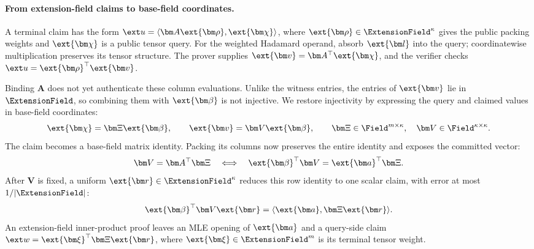 \paragraph{From extension-field claims to base-field coordinates.}
A terminal claim has the form
\(\ext u=\langle\bm A\ext{\bm\rho},\ext{\bm\chi}\rangle\),
where \(\ext{\bm\rho}\in\ExtensionField^\kappa\) gives the public
packing weights and \(\ext{\bm\chi}\) is a public tensor query.
For the weighted Hadamard operand, absorb \(\ext{\bm l}\) into the query;
coordinatewise multiplication preserves its tensor structure.
The prover supplies \(\ext{\bm v}=\bm A^\top\ext{\bm\chi}\), and
the verifier checks \(\ext u=\ext{\bm\rho}^{\top}\ext{\bm v}\).

Binding \(\bm A\) does not yet authenticate these column evaluations.
Unlike the witness entries, the entries of \(\ext{\bm v}\) lie in
\(\ExtensionField\), so combining them with \(\ext{\bm\beta}\) is not
injective. We restore injectivity by expressing the query and claimed
values in base-field coordinates:
\[
    \ext{\bm\chi}=\bm\Xi\ext{\bm\beta},
    \qquad
    \ext{\bm v}=\bm V\ext{\bm\beta},
    \qquad
    \bm\Xi\in\Field^{m\times\kappa},
    \quad \bm V\in\Field^{\kappa\times\kappa}.
\]
The claim becomes a base-field matrix identity. Packing its columns
now preserves the entire identity and exposes the committed vector:
\begin{equation*}
    \bm V=\bm A^\top\bm\Xi
    \quad\Longleftrightarrow\quad
    \ext{\bm\beta}^{\top}\bm V
    =\ext{\bm a}^{\top}\bm\Xi.
\end{equation*}
After \(\bm V\) is fixed, a uniform
\(\ext{\bm r}\in\ExtensionField^\kappa\) reduces this row identity
to one scalar claim, with error at most \(1/|\ExtensionField|\):
\[
    \ext{\bm\beta}^{\top}\bm V\ext{\bm r}
    =\langle\ext{\bm a},\bm\Xi\ext{\bm r}\rangle.
\]
An extension-field inner-product proof leaves an MLE opening of
\(\ext{\bm a}\) and a query-side claim
\(\ext w=\ext{\bm\xi}^{\top}\bm\Xi\ext{\bm r}\), where
\(\ext{\bm\xi}\in\ExtensionField^m\) is its terminal tensor weight.

